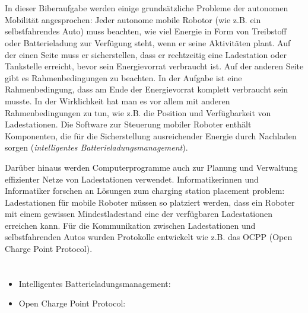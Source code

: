 {{%
\section*{\BrochureItsInformatics}
In dieser Biberaufgabe werden einige grundsätzliche Probleme der autonomen Mobilität angesprochen: Jeder autonome mobile Robotor (wie z.B. ein selbstfahrendes Auto) muss beachten, wie viel Energie in Form von Treibstoff oder Batterieladung zur Verfügung steht, wenn er seine Aktivitäten plant. Auf der einen Seite muss er sicherstellen, dass er rechtzeitig eine Ladestation oder Tankstelle erreicht, bevor sein Energievorrat verbraucht ist. Auf der anderen Seite gibt es Rahmenbedingungen zu beachten. In der Aufgabe ist eine Rahmenbedingung, dass am Ende der Energievorrat komplett verbraucht sein musste. In der Wirklichkeit hat man es vor allem mit anderen Rahmenbedingungen zu tun, wie z.B. die Position und Verfügbarkeit von Ladestationen. Die Software zur Steuerung mobiler Roboter enthält Komponenten, die für die Sicherstellung ausreichender Energie durch Nachladen sorgen (\emph{intelligentes Batterieladungsmanagement}).

Darüber hinaus werden Computerprogramme auch zur Planung und Verwaltung effizienter Netze von Ladestationen verwendet. Informatikerinnen und Informatiker forschen an Lösungen zum charging station placement problem: Ladestationen für mobile Roboter müssen so platziert werden, dass ein Roboter mit einem gewissen Mindestladestand eine der verfügbaren Ladestationen erreichen kann. Für die Kommunikation zwischen Ladestationen und selbstfahrenden Autos wurden Protokolle entwickelt wie z.B. das OCPP (Open Charge Point Protocol).



\section*{\BrochureWebsitesAndKeywords}
{\raggedright
\begin{itemize}
  \item Intelligentes Batterieladungsmanagement: \href{https://www.researchgate.net/publication/364734487_Intelligent_Battery_Recharge_Management_for_Mobile_Robots}{}
  \item Open Charge Point Protocol: \href{https://de.wikipedia.org/wiki/OCPP}{}
\end{itemize}


}}}
